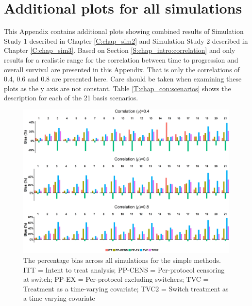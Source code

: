 \chapter{Additional plots for all simulations}

\label{A:allres}
This Appendix contains additional plots showing combined results of Simulation Study 1 described in Chapter \ref{C:chap_sim2} and Simulation Study 2 described in Chapter \ref{C:chap_sim3}. Based on Section \ref{S:chap_intro:correlation} and \cite{Ciani2014} only results for a realistic range for the correlation between time to progression and overall survival are presented in this Appendix. That is only the correlations of 0.4, 0.6 and 0.8 are presented here. Care should be taken when examining these plots as the y axis are not constant. Table \ref{T:chap_con:scenarios} shows the description for each of the 21 basis scenarios.

\clearpage

\begin{figure}
    \centering
    \includegraphics[width=20cm]{images/app_allres/simp_bias4.png}
    \caption{The percentage bias across all simulations for the simple methods. \\ ITT = Intent to treat analysis; PP-CENS = Per-protocol censoring at switch; PP-EX = Per-protocol excluding switchers; TVC = Treatment as a time-varying covariate; TVC2 = Switch treatment as a time-varying covariate}
    \label{F:allp:simple}
\end{figure}

